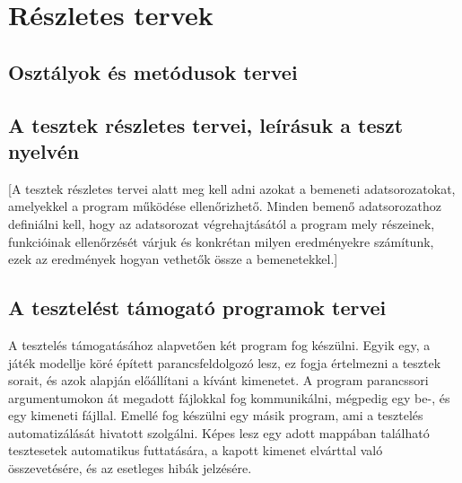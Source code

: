 %
\chapter{Részletes tervek}

\thispagestyle{fancy}

\section{Osztályok és metódusok tervei}



\section{A tesztek részletes tervei, leírásuk a teszt nyelvén}
[A tesztek részletes tervei alatt meg kell adni azokat a bemeneti adatsorozatokat, amelyekkel a program működése ellenőrizhető. Minden bemenő adatsorozathoz definiálni kell, hogy az adatsorozat végrehajtásától a program mely részeinek, funkcióinak ellenőrzését várjuk és konkrétan milyen eredményekre számítunk, ezek az eredmények hogyan vethetők össze a bemenetekkel.]




\section{A tesztelést támogató programok tervei}
A tesztelés támogatásához alapvetően két program fog készülni. Egyik egy, a játék modellje köré épített parancsfeldolgozó lesz, ez fogja értelmezni a tesztek sorait, és azok alapján előállítani a kívánt kimenetet. A program parancssori argumentumokon át megadott fájlokkal fog kommunikálni, mégpedig egy be-, és egy kimeneti fájllal. Emellé fog készülni egy másik program, ami a tesztelés automatizálását hivatott szolgálni. Képes lesz egy adott mappában található tesztesetek automatikus futtatására, a kapott kimenet elvárttal való összevetésére, és az esetleges hibák jelzésére.

